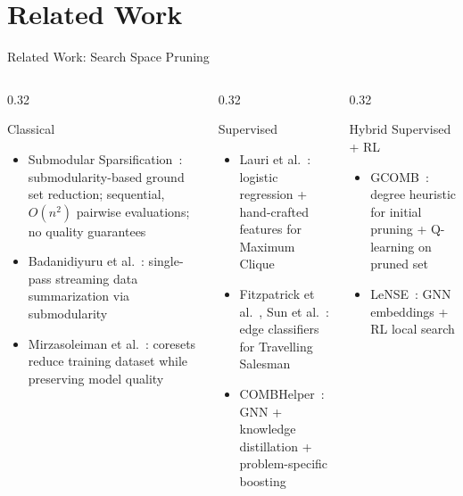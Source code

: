 \documentclass[aspectratio=169,xcolor=dvipsnames,8pt]{beamer}
\begin{document}
\section{Related Work}

\begin{frame}{Related Work: Search Space Pruning}
  \begin{columns}[T]
    \begin{column}{0.32\textwidth}
      \begin{block}{\faBook\; Classical}
        \begin{itemize}
          \item Submodular Sparsification~\cite{zhou2017scaling}: submodularity-based ground set
            reduction; sequential, $O(n^2)$ pairwise evaluations; no quality guarantees
          \item Badanidiyuru et al.~\cite{badanidiyuru2014streaming}: single-pass streaming data
            summarization via submodularity
          \item Mirzasoleiman et al.~\cite{mirzasoleiman2020coresets}: coresets reduce training
            dataset while preserving model quality
        \end{itemize}
      \end{block}
    \end{column}
    \begin{column}{0.32\textwidth}
      \begin{block}{\faGraduationCap\; Supervised}
        \begin{itemize}
          \item Lauri et al.~\cite{lauri2019fine,lauri2023learning}: logistic regression +
            hand-crafted features for Maximum Clique
          \item Fitzpatrick et al.~\cite{fitzpatrick2021learning}, Sun et al.~\cite{sun2021generalization}:
            edge classifiers for Travelling Salesman 
          \item COMBHelper~\cite{tian2024combhelper}: GNN + knowledge distillation +
            problem-specific boosting
        \end{itemize}
      \end{block}
    \end{column}
    \begin{column}{0.32\textwidth}
      \begin{block}{\faBrain\; Hybrid Supervised + RL}
        \begin{itemize}
          \item GCOMB~\cite{manchanda2020gcomb}: degree heuristic for initial pruning +
            Q-learning on pruned set
          \item LeNSE~\cite{ireland2022lense}: GNN embeddings + RL local search
        \end{itemize}
      \end{block}
    \end{column}
  \end{columns}
\end{frame}
\end{document}
